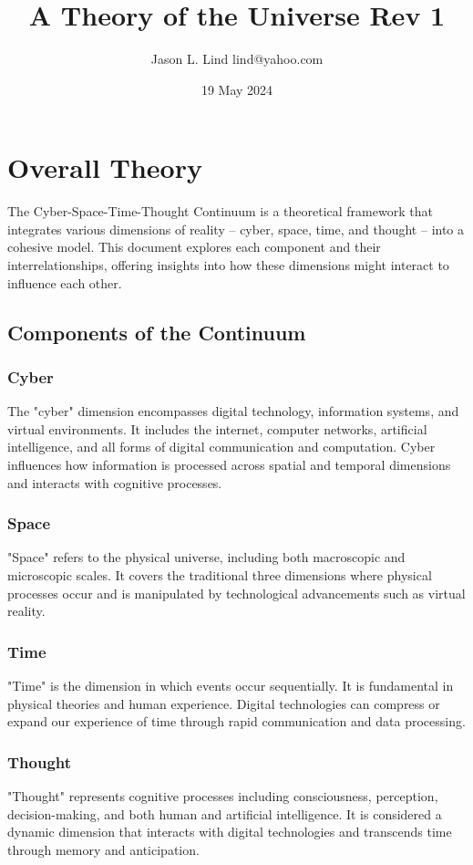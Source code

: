 \documentclass{article}
\begin{document}
\title{A Theory of the Universe Rev 1}
\author{Jason L. Lind lind@yahoo.com}
\date{19 May 2024}
\maketitle
\section*{Overall Theory}
The Cyber-Space-Time-Thought Continuum is a theoretical framework that integrates various dimensions of reality -- cyber, space, time, and thought -- into a cohesive model. This document explores each component and their interrelationships, offering insights into how these dimensions might interact to influence each other.

\subsection{Components of the Continuum}
\subsubsection{Cyber}
The "cyber" dimension encompasses digital technology, information systems, and virtual environments. It includes the internet, computer networks, artificial intelligence, and all forms of digital communication and computation. Cyber influences how information is processed across spatial and temporal dimensions and interacts with cognitive processes.

\subsubsection{Space}
"Space" refers to the physical universe, including both macroscopic and microscopic scales. It covers the traditional three dimensions where physical processes occur and is manipulated by technological advancements such as virtual reality.

\subsubsection{Time}
"Time" is the dimension in which events occur sequentially. It is fundamental in physical theories and human experience. Digital technologies can compress or expand our experience of time through rapid communication and data processing.

\subsubsection{Thought}
"Thought" represents cognitive processes including consciousness, perception, decision-making, and both human and artificial intelligence. It is considered a dynamic dimension that interacts with digital technologies and transcends time through memory and anticipation.
\end{document}
